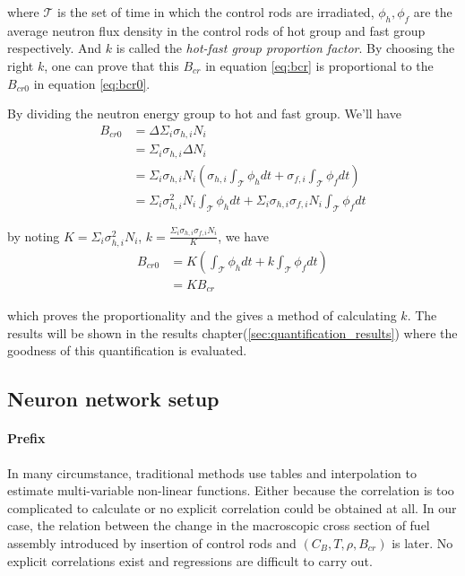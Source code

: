 where $\mathcal{T}$ is the set of time in which the control rods are irradiated,
$\phi_h,\phi_f$ are the average neutron flux density in the control rods
of hot group and fast group respectively.
And $k$ is called the \textit{hot-fast group proportion factor}.
By choosing the right $k$, one can prove that this $B_{cr}$ in equation \ref{eq:bcr}
is proportional to the $B_{cr0}$ in equation \ref{eq:bcr0}.

By dividing the neutron energy group to hot and fast group. We'll have
\begin{align*}
    B_{cr0} & = \Delta\Sigma_i \sigma_{h,i} N_i                                                                                           \\
            & = \Sigma_i \sigma_{h,i} \Delta N_i                                                                                          \\
            & = \Sigma_i \sigma_{h,i} N_i(\sigma_{h,i} \int_{\mathcal{T}}\phi_hdt + \sigma_{f,i}\int_{\mathcal{T}}\phi_fdt)               \\
            & = \Sigma_i \sigma_{h,i}^2 N_i \int_{\mathcal{T}}\phi_hdt + \Sigma_i \sigma_{h,i}\sigma_{f,i} N_i \int_{\mathcal{T}}\phi_fdt
\end{align*}

by noting $K = \Sigma_i \sigma_{h,i}^2 N_i $,
$k = \frac{\Sigma_i \sigma_{h,i}\sigma_{f,i} N_i}{K}$, we have
\begin{align}
    \label{eq:proved}
    \nonumber
    B_{cr0} & = K(\int_{\mathcal{T}}\phi_hdt + k\int_{\mathcal{T}}\phi_fdt) \\
            & = KB_{cr}
\end{align}

which proves the proportionality and the gives a method of calculating $k$.
The results will be shown in the results chapter(\ref{sec:quantification_results})
where the goodness of this quantification is evaluated.

\subsection{Neuron network setup}
\label{sec:neuron_network_setup}
\paragraph{Prefix}
\label{sec:dnn_pre}
In many circumstance, traditional methods use tables and interpolation to estimate
multi-variable non-linear functions.
Either because the correlation is too complicated to calculate or
no explicit correlation could be obtained at all.
In our case, the relation between the change in the macroscopic cross section of
fuel assembly introduced by insertion of control rods and $(C_B, T, \rho, B_{cr})$ is later.
No explicit correlations exist and regressions are difficult to carry out.

